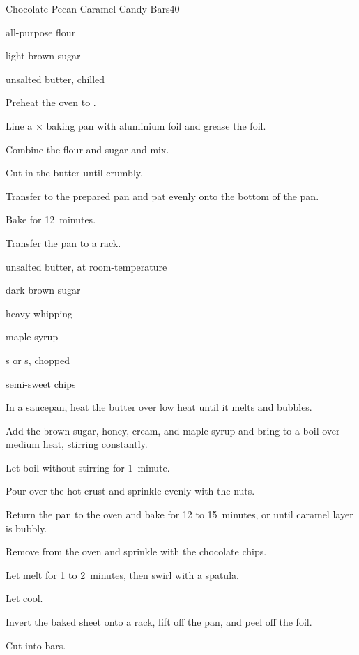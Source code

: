 \begin{recipe}{Chocolate-Pecan Caramel Candy Bars}{}{40}


\begin{ingredients}
\item \C{1\half} all-purpose flour
\item \C{\half} light brown sugar
\item \C{\half} unsalted butter, chilled
\end{ingredients}

\begin{directions}
\item Preheat the oven to .
\item Line a $\times$ baking pan with aluminium foil and grease the foil.
\item Combine the flour and sugar and mix.
\item Cut in the butter until crumbly.
\item Transfer to the prepared pan and pat evenly onto the bottom of the pan.
\item Bake for 12~minutes.
\item Transfer the pan to a rack.
\end{directions}


\begin{ingredients}
\item {} unsalted butter, at room-temperature
\item {} dark brown sugar
\item {} 
\item {} heavy whipping 
\item {} maple syrup
\item \C{1\half} s or s, chopped
\item \C{\half} semi-sweet  chips
\end{ingredients}

\begin{directions}
\item In a saucepan, heat the butter over low heat until it melts and bubbles.
\item Add the brown sugar, honey, cream, and maple syrup and bring to a boil over medium heat, stirring constantly.
\item Let boil without stirring for 1~minute.
\item Pour over the hot crust and sprinkle evenly with the nuts.
\item Return the pan to the oven and bake for 12 to 15~minutes, or until caramel layer is bubbly.
\item Remove from the oven and sprinkle with the chocolate chips.
\item Let melt for 1 to 2~minutes, then swirl with a spatula.
\item Let cool.
\item Invert the baked sheet onto a rack, lift off the pan, and peel off the foil.
\item Cut into bars.
\end{directions}

\end{recipe}
